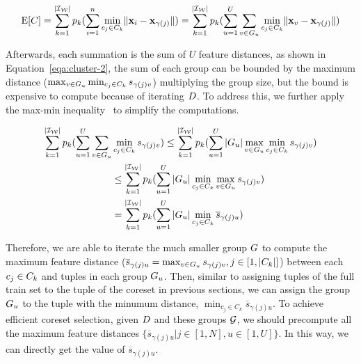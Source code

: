 \begin{equation}\label{eqa:cluster-1}
    \mathrm{E}[C] = \sum_{k= 1}^{|\mathcal{I_W}|} p_k (\sum_{i=1}^n \min_{c_j\in C_k}\lVert\mathbf{x}_i - \mathbf{x}_{\gamma(j)}\rVert) =  \sum_{k= 1}^{|\mathcal{I_W}|} p_k (\sum_{u=1}^U\sum_{v \in G_u} \min_{c_j\in C_k}\lVert\mathbf{x}_v - \mathbf{x}_{\gamma(j)}\rVert)
\end{equation}

Afterwards, each summation is the sum of $U$ feature distances, as shown in Equation~\ref{eqa:cluster-2},  the sum of each group can be bounded by  the maximum distance ($\max_{v \in G_u} \min_{c_j\in C_k} s_{\gamma(j)v}$)  multiplying the  group size, but the bound is expensive to compute because of iterating $D$. To address this, we further apply the max-min inequality~\cite{boyd2004convex} to simplify the computations. 


\begin{equation}\label{eqa:cluster-2}
    \begin{aligned}
        \sum_{k= 1}^{|\mathcal{I_W}|} p_k (\sum_{u=1}^U\sum_{v \in G_u} & \min_{c_j\in C_k} s_{\gamma(j)v}) \leq \sum_{k= 1}^{|\mathcal{I_W}|} p_k (\sum_{u=1}^U |G_u| \max_{v \in G_u} \min_{c_j\in C_k}s_{\gamma(j)v}) \\
        & \leq \sum_{k= 1}^{|\mathcal{I_W}|} p_k (\sum_{u=1}^U |G_u| \min_{c_j\in C_k} \max_{v \in G_u}s_{\gamma(j)v}) \\
        & =  \sum_{k= 1}^{|\mathcal{I_W}|} p_k (\sum_{u=1}^U |G_u| \min_{c_j\in C_k} \overline{s}_{\gamma(j)u})
    \end{aligned}
\end{equation}



Therefore,  we are able to iterate the much smaller group $G$ to compute  the maximum feature distance (\ie $\overline{s}_{\gamma(j)u} = \max_{v \in G_u}s_{\gamma(j)v}, j \in [1,|C_k|]$) between each $c_j \in C_k$ and tuples in each group $G_u$. Then, similar to assigning tuples of the full train set to the tuple of the coreset in previous sections, we can assign the group $G_u$ to the tuple  with the minumum distance, \ie $\min_{c_j\in C_k} \overline{s}_{\gamma(j)u}$. To achieve efficient coreset selection, given $D$ and these groups $\mathcal{G}$, we should precompute all the maximum feature distances $\{\overline{s}_{\gamma(j)u}|j \in [1,N], u \in [1,U]\}$. In this way, we can directly get the value of $\overline{s}_{\gamma(j)u}$.


